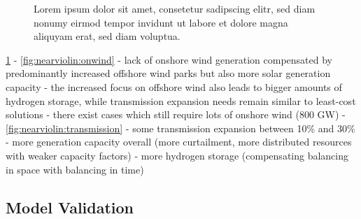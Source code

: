 \begin{figure}
    \noindent{}
    \caption{Lorem ipsum dolor sit amet, consetetur sadipscing elitr, sed diam nonumy eirmod tempor invidunt ut labore et dolore magna aliquyam erat, sed diam voluptua.}
    \label{fig:nearviolin}
\end{figure}

\cref{fig:nearviolin}
- \cref{fig:nearviolin:onwind}
  - lack of onshore wind generation compensated by predominantly increased offshore wind parks but also more solar generation capacity
  - the increased focus on offshore wind also leads to bigger amounts of hydrogen storage, while transmission expansion needs remain similar to least-cost solutions
  - there exist cases which still require lots of onshore wind (800 GW)
- \cref{fig:nearviolin:transmission}
  - some transmission expansion between 10\% and 30\%
  - more generation capacity overall (more curtailment, more distributed resources with weaker capacity factors)
  - more hydrogen storage (compensating balancing in space with balancing in time)

\subsection{Model Validation}


